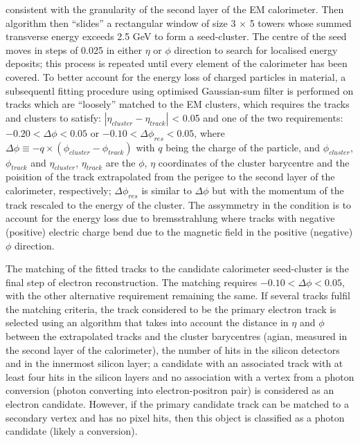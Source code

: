 consistent with the granularity of the second layer of the EM calorimeter. 
Then algorithm then ``slides'' a rectangular window of size 3 $\times$ 5 towers 
whose summed transverse energy exceeds 2.5 GeV to form a seed-cluster.
The centre of the seed moves in steps of 0.025 in either $\eta$ or $\phi$ direction 
to search for localised energy deposits; 
this process is repeated until every element of the calorimeter has been covered.
To better account for the energy loss of charged particles in material,
a subsequentl fitting procedure using optimised Gaussian-sum filter \cite{ATLAS-CONF-2012-047} 
is performed on tracks which are ``loosely'' matched to the EM clusters, 
which requires the tracks and clusters to satisfy:
$|\eta_{cluster} - \eta_{track}|$ < 0.05
and one of the two requirements:
$-0.20 < \Delta \phi < 0.05$ 
or
$-0.10 < \Delta \phi_{res} < 0.05$,
where $\Delta\phi \equiv -q \times (\phi_{cluster} - \phi_{track})$ with 
$q$ being the charge of the particle, and 
$\phi_{cluster}$, $\phi_{track}$ and $\eta_{cluster}$, $\eta_{track}$ 
are the $\phi$, $\eta$ coordinates of
the cluster barycentre and the poisition of the track extrapolated from the 
perigee to the second layer of the calorimeter, respectively;
$\Delta \phi_{res}$ is similar to $\Delta \phi$ but with the 
momentum of the track rescaled to the energy of the cluster.
The assymmetry in the condition is to account for the energy loss
due to bremsstrahlung where tracks with negative (positive) electric charge
bend due to the magnetic field in the positive (negative) $\phi$ direction.

The matching of the fitted tracks to the candidate calorimeter seed-cluster
is the final step of electron reconstruction. 
The matching requires $-0.10 < \Delta\phi < 0.05$,
with the other alternative requirement remaining the same.
If several tracks fulfil the matching criteria, 
the track considered to be the primary electron track is selected 
using an algorithm that takes into account the distance in $\eta$
and $\phi$ between the extrapolated tracks and the cluster barycentres 
(agian, measured in the second layer of the calorimeter), 
the number of hits in the silicon detectors and in the innermost silicon layer; 
a candidate with an associated track with at least four hits in the silicon layers and no association
with a vertex from a photon conversion (photon converting into electron-positron pair) 
is considered as an electron candidate. 
However, if the primary candidate track can be matched to a secondary vertex and has no pixel hits, 
then this object is classified as a photon candidate (likely a conversion). 

